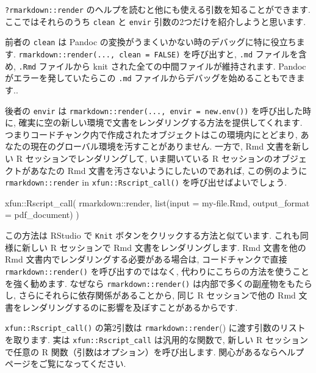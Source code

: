 \documentclass[
  11pt,
  lualatex,
  ja=standard]{bxjsreport}
\newenvironment{Shaded}{\begin{snugshade}}{\end{snugshade}}
\newcommand{\AttributeTok}[1]{\textcolor[rgb]{0.77,0.63,0.00}{#1}}
\newcommand{\FunctionTok}[1]{\textcolor[rgb]{0.00,0.00,0.00}{#1}}
\newcommand{\NormalTok}[1]{#1}
\newcommand{\SpecialCharTok}[1]{\textcolor[rgb]{0.00,0.00,0.00}{#1}}
\newcommand{\StringTok}[1]{\textcolor[rgb]{0.31,0.60,0.02}{#1}}
\begin{document}
\texttt{?rmarkdown::render} のヘルプを読むと他にも使える引数を知ることができます. ここではそれらのうち \texttt{clean} と \texttt{envir} 引数の2つだけを紹介しようと思います.

前者の \texttt{clean} は Pandoc の変換がうまくいかない時のデバッグに特に役立ちます. \texttt{rmarkdown::render(..., clean = FALSE)} を呼び出すと, \texttt{.md} ファイルを含め, \texttt{.Rmd} ファイルから knit された全ての中間ファイルが維持されます. Pandoc がエラーを発していたらこの \texttt{.md} ファイルからデバッグを始めることもできます..

後者の \texttt{envir} は \texttt{rmarkdown::render(..., envir = new.env())} を呼び出した時に, 確実に空の新しい環境で文書をレンダリングする方法を提供してくれます. つまりコードチャンク内で作成されたオブジェクトはこの環境内にとどまり, あなたの現在のグローバル環境を汚すことがありません. 一方で, Rmd 文書を新しい R セッションでレンダリングして, いま開いている R セッションのオブジェクトがあなたの Rmd 文書を汚さないようにしたいのであれば, この例のように \texttt{rmarkdown::render} in \texttt{xfun::Rscript\_call()} を呼び出せばよいでしょう.

\begin{Shaded}
\begin{Highlighting}[numbers=left,,]
\NormalTok{xfun}\SpecialCharTok{::}\FunctionTok{Rscript\_call}\NormalTok{(}
\NormalTok{  rmarkdown}\SpecialCharTok{::}\NormalTok{render,}
  \FunctionTok{list}\NormalTok{(}\AttributeTok{input =} \StringTok{\textquotesingle{}my{-}file.Rmd\textquotesingle{}}\NormalTok{, }\AttributeTok{output\_format =} \StringTok{\textquotesingle{}pdf\_document\textquotesingle{}}\NormalTok{)}
\NormalTok{)}
\end{Highlighting}
\end{Shaded}

この方法は RStudio で \texttt{Knit} ボタンをクリックする方法と似ています. これも同様に新しい R セッションで Rmd 文書をレンダリングします. Rmd 文書を他の Rmd 文書内でレンダリングする必要がある場合は, コードチャンクで直接 \texttt{rmarkdown::render()} を呼び出すのではなく, 代わりにこちらの方法を使うことを強く勧めます. なぜなら \texttt{rmarkdown::render()} は内部で多くの副産物をもたらし, さらにそれらに依存関係があることから, 同じ R セッションで他の Rmd 文書をレンダリングするのに影響を及ぼすことがあるからです.

\texttt{xfun::Rscript\_call()} の第2引数は \texttt{rmarkdown::render}() に渡す引数のリストを取ります. 実は \texttt{xfun::Rscript\_call} は汎用的な関数で, 新しい R セッションで任意の R 関数（引数はオプション）を呼び出します. 関心があるならヘルプページをご覧になってください.
\end{document}
